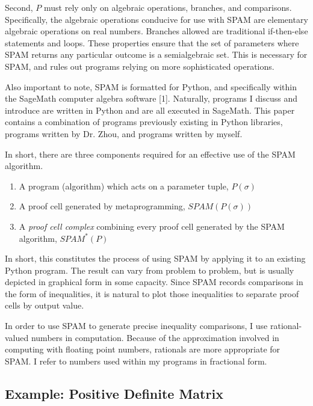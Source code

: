 \documentclass{article}
\begin{document}
Second, $P$ must rely only on algebraic operations, branches, and comparisons. Specifically, the algebraic operations conducive for use with SPAM are elementary algebraic operations on real numbers. Branches allowed are traditional if-then-else statements and loops. These properties ensure that the set of parameters where SPAM returns any particular outcome is a semialgebraic set. This is necessary for SPAM, and rules out programs relying on more sophisticated operations. 

Also important to note, SPAM is formatted for Python, and specifically within the SageMath computer algebra software [1]. Naturally, programs I discuss and introduce are written in Python and are all executed in SageMath. This paper contains a combination of programs previously existing in Python libraries, programs written by Dr. Zhou, and programs written by myself. 

In short, there are three components required for an effective use of the SPAM algorithm.
\begin{enumerate}
    \item A program (algorithm) which acts on a parameter tuple, $P(\sigma)$
    \item A proof cell generated by metaprogramming, $SPAM(P(\sigma))$
    \item A \textit{proof cell complex} combining every proof cell generated by the SPAM algorithm, $SPAM^*(P)$
\end{enumerate}

In short, this constitutes the process of using SPAM by applying it to an existing Python program. The result can vary from problem to problem, but is usually depicted in graphical form in some capacity. Since SPAM records comparisons in the form of inequalities, it is natural to plot those inequalities to separate proof cells by output value. 

\begin{notes}
\item In order to use SPAM to generate precise inequality comparisons, I use rational-valued numbers in computation. Because of the approximation involved in computing with floating point numbers, rationals are more appropriate for SPAM. I refer to numbers used within my programs in fractional form.
\end{notes}

\subsection{Example: Positive Definite Matrix}
\end{document}
